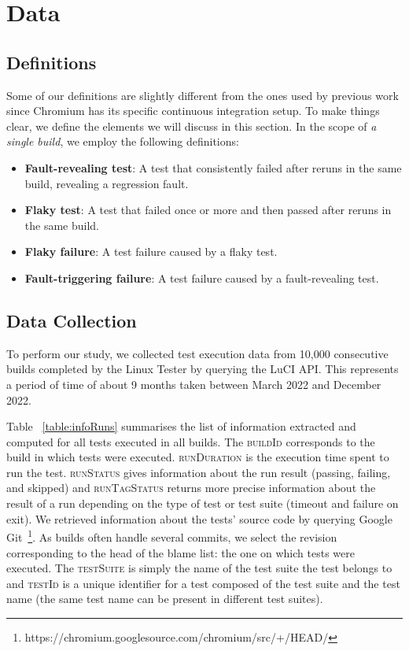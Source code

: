 \section{Data}
\label{sec:chromium-data}

\subsection{Definitions}

Some of our definitions are slightly different from the ones used by previous work since Chromium has its specific continuous integration setup. To make things clear, we define the elements we will discuss in this section.  
In the scope of \emph{a single build}, we employ the following definitions: 
\begin{itemize}
    \item \textbf{Fault-revealing test}: A test that consistently failed after reruns in the same build, revealing a regression fault.
    \item \textbf{Flaky test}: A test that failed once or more and then passed after reruns in the same build. 
    \item\textbf{Flaky failure}: A test failure caused by a flaky test.
    \item\textbf{Fault-triggering failure}: A test failure caused by a fault-revealing test.\\
\end{itemize}


\subsection{Data Collection}

To perform our study, we collected test execution data from 10,000 consecutive builds completed by the Linux Tester by querying the LuCI API. This represents a period of time of about 9 months taken between March 2022 and December 2022. 

Table ~\ref{table:infoRuns} summarises the list of information extracted and computed for all tests executed in all builds. The \textsc{buildId} corresponds to the build in which tests were executed. \textsc{runDuration} is the execution time spent to run the test. \textsc{runStatus} gives information about the run result (\eg passing, failing, and skipped) and \textsc{runTagStatus} returns more precise information about the result of a run depending on the type of test or test suite (\eg timeout and failure on exit). We retrieved information about the tests' source code by querying Google Git~\footnote{https://chromium.googlesource.com/chromium/src/+/HEAD/}. As builds often handle several commits, we select the revision corresponding to the head of the blame list: the one on which tests were executed. The \textsc{testSuite} is simply the name of the test suite the test belongs to and \textsc{testId} is a unique identifier for a test composed of the test suite and the test name (the same test name can be present in different test suites).

